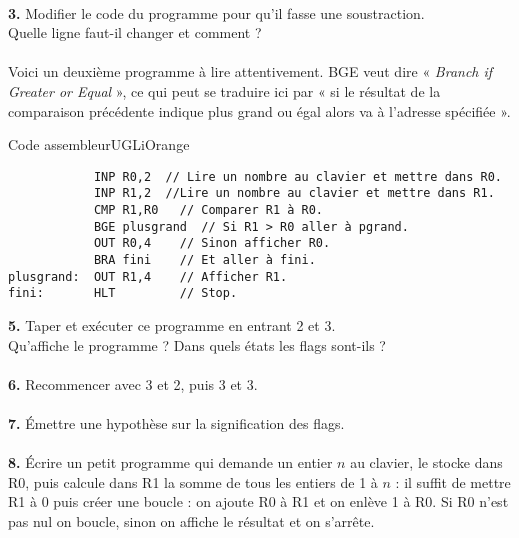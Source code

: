 \documentclass[11pt,a4paper,eval,firamath]{nsi}
\begin{document}
\\


\textbf{3.} Modifier le code du programme pour qu'il fasse une soustraction.\\
Quelle ligne faut-il changer et comment ?\\

\\

Voici un deuxième programme à lire attentivement. BGE veut dire « \textit{Branch if Greater or Equal} », ce qui peut se traduire ici par « si le résultat de la comparaison précédente indique  plus grand ou égal alors va à l'adresse spécifiée ».

\begin{encadrecolore}{Code assembleur}{UGLiOrange}
\begin{verbatim}
            INP R0,2  // Lire un nombre au clavier et mettre dans R0.
            INP R1,2  //Lire un nombre au clavier et mettre dans R1.
            CMP R1,R0   // Comparer R1 à R0.
            BGE plusgrand  // Si R1 > R0 aller à pgrand.
            OUT R0,4    // Sinon afficher R0.
            BRA fini    // Et aller à fini.
plusgrand:  OUT R1,4    // Afficher R1.
fini:       HLT         // Stop.
\end{verbatim}
\end{encadrecolore}


\textbf{5.} Taper et exécuter ce programme en entrant 2 et 3.\\
Qu'affiche le programme ? Dans quels états les flags sont-ils ?\\

\\

\textbf{6.} Recommencer avec 3 et 2, puis 3 et 3.\\

\\

\textbf{7.} \'Emettre une hypothèse sur la signification des flags.\\

\\

\textbf{8.} \'Ecrire un petit programme qui demande un entier $n$ au clavier, le stocke dans R0, puis calcule dans R1 la
	somme de tous les entiers de 1 à $n$ : il suffit de mettre R1 à 0 puis créer une boucle : on ajoute R0 à R1 et on enlève 1 à R0. Si R0 n'est pas nul on boucle, sinon on affiche le résultat et on s'arrête.\\
\end{document}
